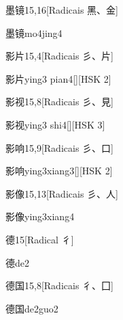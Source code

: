 \begin{entry}{墨镜}{15,16}[Radicais ⿊、⾦]
  \begin{phonetics}{墨镜}{mo4jing4}
  \end{phonetics}
\end{entry}

\begin{entry}{影片}{15,4}[Radicais ⼺、⽚]
  \begin{phonetics}{影片}{ying3 pian4}[][HSK 2]
  \end{phonetics}
\end{entry}

\begin{entry}{影视}{15,8}[Radicais ⼺、⾒]
  \begin{phonetics}{影视}{ying3 shi4}[][HSK 3]
  \end{phonetics}
\end{entry}

\begin{entry}{影响}{15,9}[Radicais ⼺、⼝]
  \begin{phonetics}{影响}{ying3xiang3}[][HSK 2]
  \end{phonetics}
\end{entry}

\begin{entry}{影像}{15,13}[Radicais ⼺、⼈]
  \begin{phonetics}{影像}{ying3xiang4}
  \end{phonetics}
\end{entry}

\begin{entry}{德}{15}[Radical ⼻]
  \begin{phonetics}{德}{de2}
  \end{phonetics}
\end{entry}

\begin{entry}{德国}{15,8}[Radicais ⼻、⼞]
  \begin{phonetics}{德国}{de2guo2}
  \end{phonetics}
\end{entry}

